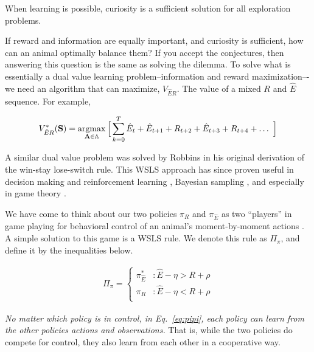 \begin{conjecture}
	When learning is possible, curiosity is a sufficient solution for all exploration problems.
\end{conjecture}

If reward and information are equally important, and curiosity is sufficient, how can an animal optimally balance them? If you accept the conjectures, then answering this question is the same as solving the dilemma. To solve what is essentially a dual value learning problem--information and reward maximization–-we need an algorithm that can maximize, $V_{\hat{E}R}$. The value of a mixed $R$ and $\hat E$ sequence. For example,

\begin{equation}
	\label{eq:bellman_seq_ER}
	V^*_{\hat{E}R}(\mathbf{S}) = \operatorname*{argmax}_{\mathbf{A} \in \mathbb{A}} \Big [\sum_{k=0}^{T} \hat{E}_t + \hat{E}_{t+1} + R_{t+2} + \hat{E}_{t+3} + R_{t+4} + \ldots  \ \Big ]
\end{equation}

A similar dual value problem was solved by Robbins \cite{Robbins1952} in his original derivation of the win-stay lose-switch rule. This WSLS approach has since proven useful in decision making and reinforcement learning \cite{Estes1994TowardAS,Worthy2014}, Bayesian sampling \cite{Bonawitz2014}, and especially in game theory \cite{Nowak1993}. 

We have come to think about our two policies $\pi_R$ and $\pi_{\hat E}$ as two ``players'' in game playing for behavioral control of an animal's moment-by-moment actions \cite{Estes1994TowardAS}. A simple solution to this game is a WSLS rule. We denote this rule as $\Pi_\pi$, and define it by the inequalities below. 

\begin{equation} 
    \label{eq:pipi}
    \begin{split}
        \Pi_{\pi} = 
        \begin{cases}
            \pi^*_{\hat{E}} & : \hat{E} - \eta > R + \rho \\
            \pi_R 	& : \hat{E} - \eta < R + \rho \\
        \end{cases}
    \end{split}
\end{equation}

\emph{No matter which policy is in control, in Eq.~\ref{eq:pipi}, each policy can learn from the other policies actions and observations.} That is, while the two policies do compete for control, they also learn from each other in a cooperative way.


